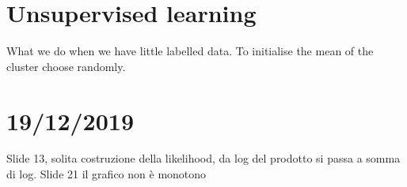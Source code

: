 \chapter{Unsupervised learning}
What we do when we have little labelled data. \newline
To initialise the mean of the cluster choose randomly. \newline
\chapter{19/12/2019}
Slide 13, solita costruzione della likelihood, da log del prodotto si passa a somma di log. \newline
Slide 21 il grafico non è monotono\newline
































